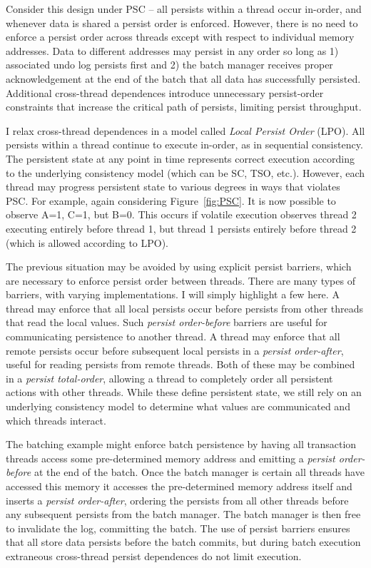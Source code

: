 Consider this design under PSC -- all persists within a thread occur in-order, and whenever data is shared a persist order is enforced.
However, there is no need to enforce a persist order across threads except with respect to individual memory addresses.
Data to different addresses may persist in any order so long as 1) associated undo log persists first and 2) the batch manager receives proper acknowledgement at the end of the batch that all data has successfully persisted.
Additional cross-thread dependences introduce unnecessary persist-order constraints that increase the critical path of persists, limiting persist throughput.

I relax cross-thread dependences in a model called \emph{Local Persist Order} (LPO).
All persists within a thread continue to execute in-order, as in sequential consistency.
The persistent state at any point in time represents correct execution according to the underlying consistency model (which can be SC, TSO, etc.).
However, each thread may progress persistent state to various degrees in ways that violates PSC.
For example, again considering Figure~\ref{fig:PSC}.
It is now possible to observe A=1, C=1, but B=0.
This occurs if volatile execution observes thread 2 executing entirely before thread 1, but thread 1 persists entirely before thread 2 (which is allowed according to LPO).

The previous situation may be avoided by using explicit persist barriers, which are necessary to enforce persist order between threads.
There are many types of barriers, with varying implementations.
I will simply highlight a few here.
A thread may enforce that all local persists occur before persists from other threads that read the local values.
Such \emph{persist order-before} barriers are useful for communicating persistence to another thread.
A thread may enforce that all remote persists occur before subsequent local persists in a \emph{persist order-after}, useful for reading persists from remote threads.
Both of these may be combined in a \emph{persist total-order}, allowing a thread to completely order all persistent actions with other threads.
While these define persistent state, we still rely on an underlying consistency model to determine what values are communicated and which threads interact.

The batching example might enforce batch persistence by having all transaction threads access some pre-determined memory address and emitting a \emph{persist order-before} at the end of the batch.
Once the batch manager is certain all threads have accessed this memory it accesses the pre-determined memory address itself and inserts a \emph{persist order-after}, ordering the persists from all other threads before any subsequent persists from the batch manager.
The batch manager is then free to invalidate the log, committing the batch.
The use of persist barriers ensures that all store data persists before the batch commits, but during batch execution extraneous cross-thread persist dependences do not limit execution.


